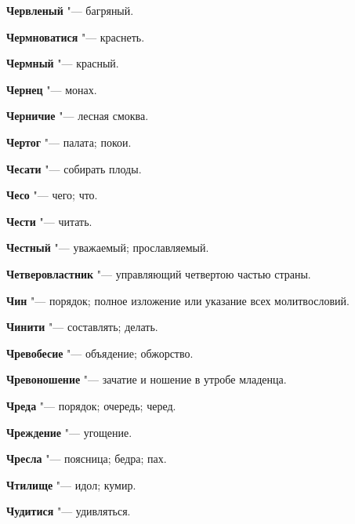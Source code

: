 \begin{mymulticols}{2}
\noindent\textbf{Червленый} "--- багряный. 




\noindent\textbf{Чермноватися} "--- краснеть. 




\noindent\textbf{Чермный} "--- красный. 




\noindent\textbf{Чернец} "--- монах. 




\noindent\textbf{Черничие} "--- лесная смоква. 




\noindent\textbf{Чертог} "--- палата; покои. 




\noindent\textbf{Чесати} "--- собирать плоды. 




\noindent\textbf{Чесо} "--- чего; что. 




\noindent\textbf{Чести} "--- читать. 




\noindent\textbf{Честный} "--- уважаемый; прославляемый. 




\noindent\textbf{Четверовластник} "--- управляющий четвертою частью страны. 




\noindent\textbf{Чин} "--- порядок; полное изложение или указание всех молитвословий. 




\noindent\textbf{Чинити} "--- составлять; делать. 




\noindent\textbf{Чревобесие} "--- объядение; обжорство. 




\noindent\textbf{Чревоношение} "--- зачатие и ношение в утробе младенца. 




\noindent\textbf{Чреда} "--- порядок; очередь; черед. 




\noindent\textbf{Чреждение} "--- угощение. 




\noindent\textbf{Чресла} "--- поясница; бедра; пах. 




\noindent\textbf{Чтилище} "--- идол; кумир. 




\noindent\textbf{Чудитися} "--- удивляться. 





\end{mymulticols}
